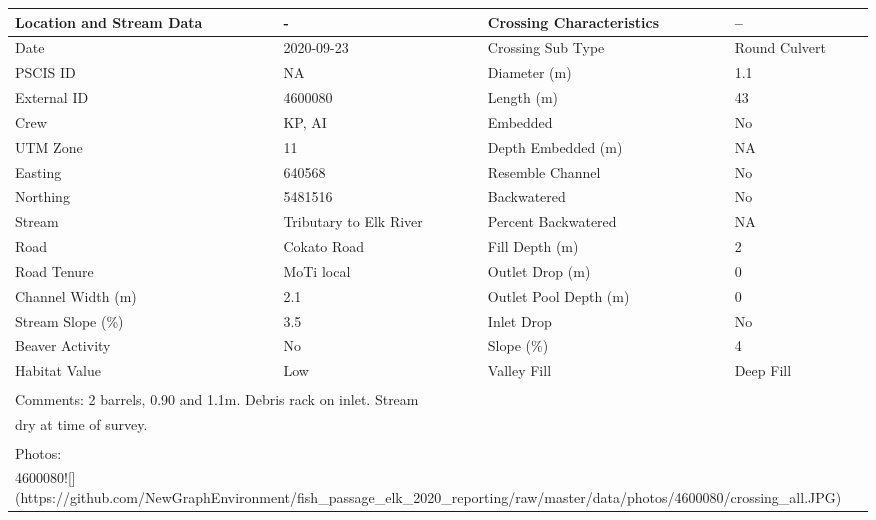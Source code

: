\documentclass[
]{book}
\begin{document}
\begin{tabular}{l|l|l|l}
\hline
Location and Stream Data & - & Crossing Characteristics & --\\
\hline
Date & 2020-09-23 & Crossing Sub Type & Round Culvert\\
\hline
PSCIS ID & NA & Diameter (m) & 1.1\\
\hline
External ID & 4600080 & Length (m) & 43\\
\hline
Crew & KP, AI & Embedded & No\\
\hline
UTM Zone & 11 & Depth Embedded (m) & NA\\
\hline
Easting & 640568 & Resemble Channel & No\\
\hline
Northing & 5481516 & Backwatered & No\\
\hline
Stream & Tributary to Elk River & Percent Backwatered & NA\\
\hline
Road & Cokato Road & Fill Depth (m) & 2\\
\hline
Road Tenure & MoTi local & Outlet Drop (m) & 0\\
\hline
Channel Width (m) & 2.1 & Outlet Pool Depth (m) & 0\\
\hline
Stream Slope (\%) & 3.5 & Inlet Drop & No\\
\hline
Beaver Activity & No & Slope (\%) & 4\\
\hline
Habitat Value & Low & Valley Fill & Deep Fill\\
\hline
\multicolumn{4}{l}{\textsuperscript{} Comments: 2 barrels, 0.90 and 1.1m. Debris rack on inlet. Stream}\\
\multicolumn{4}{l}{dry at time of survey.}\\
\multicolumn{4}{l}{\textsuperscript{} Photos:}\\
\multicolumn{4}{l}{4600080![](https://github.com/NewGraphEnvironment/fish\_passage\_elk\_2020\_reporting/raw/master/data/photos/4600080/crossing\_all.JPG)}\\
\end{tabular}
\end{document}
